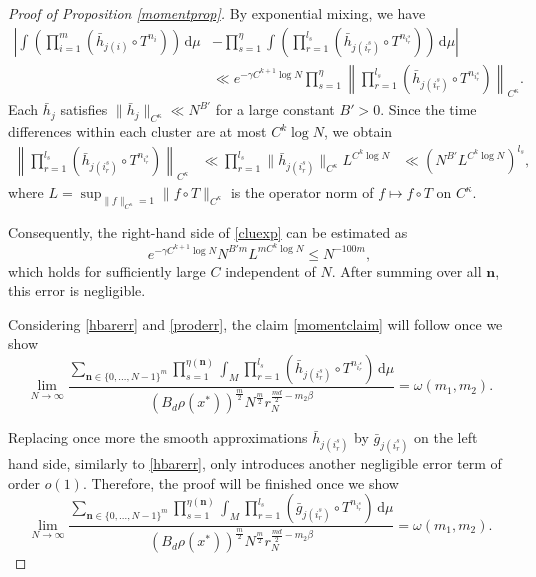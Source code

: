 \documentclass[10pt,a4paper]{amsart}
\renewcommand{\d}{\, \text{d}}
\begin{document}
\begin{proof}[Proof of Proposition \ref{momentprop}]
By exponential mixing, we have
\begin{equation}\label{cluexp}
\begin{aligned}
\left|\int \left(\prod_{i=1}^m (\bar{h}_{j(i)} \circ T^{n_i})\right) \d\mu \right.&\left.-\prod_{s=1}^{\eta}\int\left(\prod_{r=1}^{l_s} (\bar{h}_{j(i^s_r)} \circ T^{n_{i^s_r}})\right) \d\mu\right|\\
&\ll e^{-\gamma C^{k+1} \log N}\prod_{s=1}^\eta\left\|\prod_{r=1}^{l_s} (\bar{h}_{j(i^s_r)} \circ T^{n_{i^s_r}})\right\|_{C^{\kappa}}.
\end{aligned}
\end{equation}
Each $\bar{h}_j$ satisfies $\|\bar{h}_j\|_{C^{\kappa}} \ll N^{B'}$ for a large constant $B'>0$. Since the time differences within each cluster are at most $C^k \log N$, we obtain
\begin{align*}
\left\|\prod_{r=1}^{l_s} (\bar{h}_{j(i^s_r)} \circ T^{n_{i^s_r}})\right\|_{C^{\kappa}} &\ll\prod_{r=1}^{l_s} \| \bar{h}_{j(i^s_r)} \|_{C^{\kappa}} L^{C^k \log N}&\ll\left(N^{B'} L^{C^k \log N}\right)^{l_s},
\end{align*}
where $L=\sup_{\|f\|_{C^{\kappa}}=1} \|f\circ T\|_{C^{\kappa}}$ is the operator norm of $f\mapsto f\circ T$ on $C^{\kappa}$.

Consequently, the right-hand side of \eqref{cluexp} can be estimated as
\begin{equation}\label{proderr}
e^{-\gamma C^{k+1}\log N}N^{B'm}L^{mC^k\log N}\le N^{-100m},
\end{equation}
which holds for sufficiently large $C$ independent of $N.$ After summing over all $\mathbf n$, this error is negligible.




Considering \eqref{hbarerr} and \eqref{proderr}, the claim \eqref{momentclaim} will follow once we show
\begin{equation*}
\lim_{N\rightarrow \infty} \frac{\sum_{\textbf{n}\in \{0,\ldots,N-1\}^m} \prod_{s=1}^{\eta(\textbf{n})} \int_M \prod_{r=1}^{l_s} (\bar{h}_{j(i^s_r)} \circ T^{n_{i^s_r}}) \d\mu}{\left(B_d \rho(x^*)\right)^{\frac{m}{2}} N^{\frac{m}{2}} r_N^{\frac{md}{2}-m_2\beta }} = \omega(m_1,m_2).
\end{equation*}

Replacing once more the smooth approximations $\bar{h}_{j(i^s_r)}$ by $\bar{g}_{j(i^s_r)}$ on the left hand side, similarly to \eqref{hbarerr}, only introduces another negligible error term of order $o(1)$. Therefore, the proof will be finished once we show
\begin{equation}\label{momentsumclaim}
\lim_{N\rightarrow \infty} \frac{\sum_{\textbf{n}\in \{0,\ldots,N-1\}^m} \prod_{s=1}^{\eta(\textbf{n})} \int_M \prod_{r=1}^{l_s} (\bar{g}_{j(i^s_r)} \circ T^{n_{i^s_r}})\d\mu}{\left(B_d \rho(x^*)\right)^{\frac{m}{2}} N^{\frac{m}{2}} r_N^{\frac{md}{2}-m_2\beta }} = \omega(m_1,m_2).
\end{equation}


\end{proof}
\end{document}
